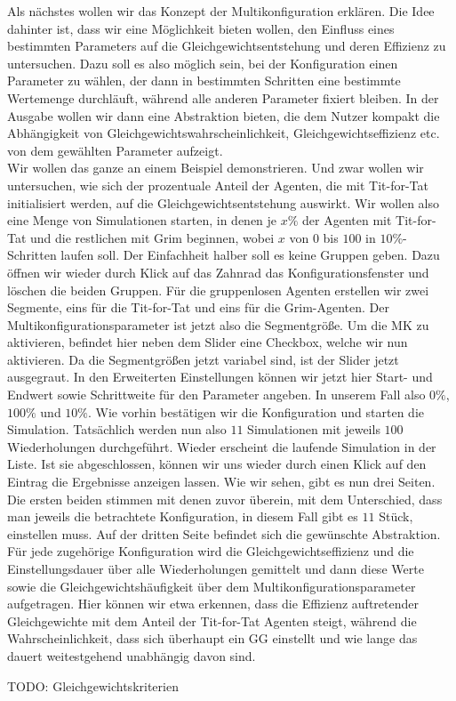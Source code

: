 \documentclass[parskip=full,11pt]{scrartcl}
\begin{document}
Als nächstes wollen wir das Konzept der Multikonfiguration erklären. Die Idee dahinter ist, dass wir eine Möglichkeit bieten wollen, den Einfluss eines bestimmten Parameters auf die Gleichgewichtsentstehung und deren Effizienz zu untersuchen. Dazu soll es also möglich sein, bei der Konfiguration einen Parameter zu wählen, der dann in bestimmten Schritten eine bestimmte Wertemenge durchläuft, während alle anderen Parameter fixiert bleiben. In der Ausgabe wollen wir dann eine Abstraktion bieten, die dem Nutzer kompakt die Abhängigkeit von Gleichgewichtswahrscheinlichkeit, Gleichgewichtseffizienz etc. von dem gewählten Parameter aufzeigt.\\
Wir wollen das ganze an einem Beispiel demonstrieren. Und zwar wollen wir untersuchen, wie sich der prozentuale Anteil der Agenten, die mit Tit-for-Tat initialisiert werden, auf die Gleichgewichtsentstehung auswirkt. Wir wollen also eine Menge von Simulationen starten, in denen je \(x\%\) der Agenten mit Tit-for-Tat und die restlichen mit Grim beginnen, wobei \(x\) von \(0\) bis \(100\) in \(10\%\)-Schritten laufen soll. Der Einfachheit halber soll es keine Gruppen geben. Dazu öffnen wir wieder durch Klick auf das Zahnrad das Konfigurationsfenster und löschen die beiden Gruppen. Für die gruppenlosen Agenten erstellen wir zwei Segmente, eins für die Tit-for-Tat und eins für die Grim-Agenten. Der Multikonfigurationsparameter ist jetzt also die Segmentgröße. Um die MK zu aktivieren, befindet hier neben dem Slider eine Checkbox, welche wir nun aktivieren. Da die Segmentgrößen jetzt variabel sind, ist der Slider jetzt ausgegraut. In den Erweiterten Einstellungen können wir jetzt hier Start- und Endwert sowie Schrittweite für den Parameter angeben. In unserem Fall also \(0\%\), \(100\%\) und \(10\%\). Wie vorhin bestätigen wir die Konfiguration und starten die Simulation. Tatsächlich werden nun also \(11\) Simulationen mit jeweils \(100\) Wiederholungen durchgeführt. Wieder erscheint die laufende Simulation in der Liste. Ist sie abgeschlossen, können wir uns wieder durch einen Klick auf den Eintrag die Ergebnisse anzeigen lassen. Wie wir sehen, gibt es nun drei Seiten. Die ersten beiden stimmen mit denen zuvor überein, mit dem Unterschied, dass man jeweils die betrachtete Konfiguration, in diesem Fall gibt es \(11\) Stück, einstellen muss. Auf der dritten Seite befindet sich die gewünschte Abstraktion. Für jede zugehörige Konfiguration wird die Gleichgewichtseffizienz und die Einstellungsdauer über alle Wiederholungen gemittelt und dann diese Werte sowie die Gleichgewichtshäufigkeit über dem Multikonfigurationsparameter aufgetragen. Hier können wir etwa erkennen, dass die Effizienz auftretender Gleichgewichte mit dem Anteil der Tit-for-Tat Agenten steigt, während die Wahrscheinlichkeit, dass sich überhaupt ein GG einstellt und wie lange das dauert weitestgehend unabhängig davon sind.

TODO: Gleichgewichtskriterien
\end{document}
